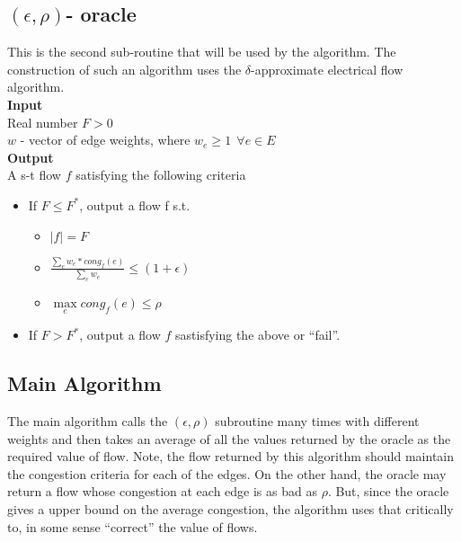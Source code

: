 \documentclass[a4paper,10pt]{article}
\newcommand{\eps}{\epsilon}
\begin{document}
	  \subsection{$(\eps,\rho)$- oracle}
	    This is the second sub-routine that will be used by the algorithm. The construction of such an algorithm uses the $\delta$-approximate
	    electrical flow algorithm. \\
	    
	    
	    \textbf{Input} \\
	    Real number $F>0$ \\
	    $w$ - vector of edge weights, where $w_e \geq 1 ~~ \forall e \in E$ \\
	    
	    \textbf{Output}\\
	    A s-t flow $f$ satisfying the following criteria \\
	    
	    \begin{itemize}
	     \item 
	      If $F \leq F^{\ast}$, output a flow f s.t.
		\begin{itemize}
		 \item 
		    $|f| = F$
		 \item
		    $\frac{\sum\limits_{e} w_e \ast cong_f(e)}{\sum\limits_{e} w_e} \leq (1+\eps)$
		 \item
		    $\max\limits_{e} cong_f(e) \leq \rho$
		\end{itemize}

	     \item
		If $F > F^{\ast}$, output a flow $f$ sastisfying the above or ``fail''.
	  \end{itemize}

	  \subsection{Main Algorithm}
	      The main algorithm calls the $(\eps,\rho)$ subroutine many times with different weights and then takes an average of all the values
	      returned by the oracle as the required value of flow. Note, the flow returned by this algorithm should maintain the congestion criteria
	      for each of the edges. On the other hand, the oracle may return a flow whose congestion at each edge is as bad as $\rho$. But, since
	      the oracle gives a upper bound on the average congestion, the algorithm uses that critically to, in some sense ``correct'' the value of 
	      flows. \\
	      
\end{document}
